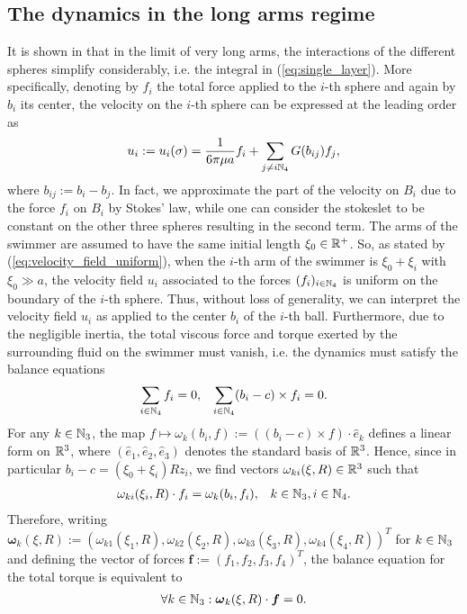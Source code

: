 \subsection{The dynamics in the long arms regime}
It is shown in \cite{Alouges2013} that in the limit of very long arms, the interactions of the different spheres simplify considerably, i.e. the integral in (\ref{eq:single_layer}). More specifically, denoting by $f_i$ the total force applied to the $i$-th sphere and again by $b_i$ its center, the velocity on the $i$-th sphere can be expressed at the leading order as
\begin{align}
\label{eq:velocity_field_uniform}
	u_i := u_i(\sigma) = \frac{1}{6 \pi \mu a} f_i + \sum_{j \neq i \mathbb{N}_4} G(b_{ij}) f_j,
\end{align}
where $b_{ij} := b_i - b_j$. In fact, we approximate the part of the velocity on $B_i$ due to the force $f_i$ on $B_i$ by Stokes' law, while one can consider the stokeslet to be constant on the other three spheres resulting in the second term. The arms of the swimmer are assumed to have the same initial length $\xi_0 \in \mathbb{R}^+$. So, as stated by (\ref{eq:velocity_field_uniform}), when the $i$-th arm of the swimmer is $\xi_0 + \xi_i$ with $\xi_0 \gg a$, the velocity field $u_i$ associated to the forces $(f_i)_{i \in \mathbb{N}_4}$ is uniform on the boundary of the $i$-th sphere. Thus, without loss of generality, we can interpret the velocity field $u_i$ as applied to the center $b_i$ of the $i$-th ball. Furthermore, due to the negligible inertia, the total viscous force and torque exerted by the surrounding fluid on the swimmer must vanish, i.e. the dynamics must satisfy the balance equations
\begin{eqnarray}
\label{eq:balance_equations}
	\sum_{i \in \mathbb{N}_4} f_i = 0, & & \sum_{i \in \mathbb{N}_4} (b_i - c) \times f_i = 0.
\end{eqnarray}
For any $k \in \mathbb{N}_3$, the map $f \mapsto \omega_k(b_i, f) := ((b_i - c) \times f) \cdot \hat{e}_k$ defines a linear form on $\mathbb{R}^3$, where $(\hat{e}_1, \hat{e}_2, \hat{e}_3)$ denotes the standard basis of $\mathbb{R}^3$. Hence, since in particular $b_i - c = (\xi_0 + \xi_i) R z_i$, we find vectors $\omega_{ki}(\xi, R) \in \mathbb{R}^3$ such that
\begin{eqnarray}
	\omega_{ki}(\xi_i, R) \cdot f_i = \omega_k(b_i, f_i), & & k \in \mathbb{N}_3, i \in \mathbb{N}_4.
\end{eqnarray}
Therefore, writing $\boldsymbol \omega_k(\xi, R) := (\omega_{k1}(\xi_1, R), \omega_{k2}(\xi_2, R), \omega_{k3}(\xi_3, R), \omega_{k4}(\xi_4, R))^T$ for $k \in \mathbb{N}_3$ and defining the vector of forces $\boldsymbol f := (f_1, f_2, f_3, f_4)^T$, the balance equation for the total torque is equivalent to
\begin{eqnarray}
\label{eq:torque_balance_equations2}
\forall k \in \mathbb{N}_3: \boldsymbol \omega_k(\xi, R) \cdot \boldsymbol f  = 0.
\end{eqnarray}

